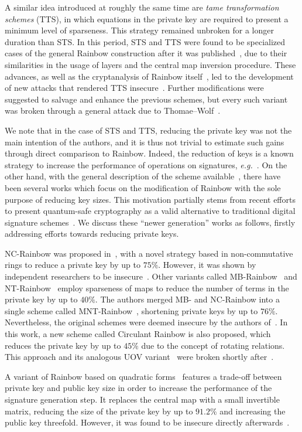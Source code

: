 \documentclass[draft, 12pt, a4paper, oneside]{memoir}
\begin{document}
A similar idea introduced at roughly the same time are \emph{tame transformation schemes} (TTS), in which equations in the private key are required to present a minimum level of sparseness. This strategy remained unbroken for a longer duration than STS. In this period, STS and TTS were found to be specialized cases of the general Rainbow construction after it was published~\cite{}, due to their similarities in the usage of layers and the central map inversion procedure. These advances, as well as the cryptanalysis of Rainbow itself~\cite{}, led to the development of new attacks that rendered TTS insecure~\cite{}. Further modifications were suggested to salvage and enhance the previous schemes, but every such variant was broken through a general attack due to Thomae--Wolf~\cite{}.

We note that in the case of STS and TTS, reducing the private key was not the main intention of the authors, and it is thus not trivial to estimate such gains through direct comparison to Rainbow. Indeed, the reduction of keys is a known strategy to increase the performance of operations on signatures, \emph{e.g.}~\cite{}. On the other hand, with the general description of the scheme available~\cite{}, there have been several works which focus on the modification of Rainbow with the sole purpose of reducing key sizes. This motivation partially stems from recent efforts to present quantum-safe cryptography as a valid alternative to traditional digital signature schemes~\cite{}. We discuss these ``newer generation''  works as follows, firstly addressing efforts towards reducing private keys.

NC-Rainbow was proposed in~\cite{}, with a novel strategy based in non-commutative rings to reduce a private key by up to $75\%$. However, it was shown by independent researchers to be insecure~\cite{}. Other variants called MB-Rainbow~\cite{} and NT-Rainbow~\cite{} employ sparseness of maps to reduce the number of terms in the private key by up to $40\%$. The authors merged MB- and NC-Rainbow into a single scheme called MNT-Rainbow~\cite{}, shortening private keys by up to $76\%$. Nevertheless, the original schemes were deemed insecure by the authors of~\cite{}. In this work, a new scheme called Circulant Rainbow is also proposed, which reduces the private key by up to $45\%$ due to the concept of rotating relations. This approach and its analogous UOV variant~\cite{} were broken shortly after~\cite{}.

A variant of Rainbow based on quadratic forms~\cite{} features a trade-off between private key and public key size in order to increase the performance of the signature generation step. It replaces the central map with a small invertible matrix, reducing the size of the private key by up to $91.2\%$ and increasing the public key threefold. However, it was found to be insecure directly afterwards~\cite{}.
\end{document}
